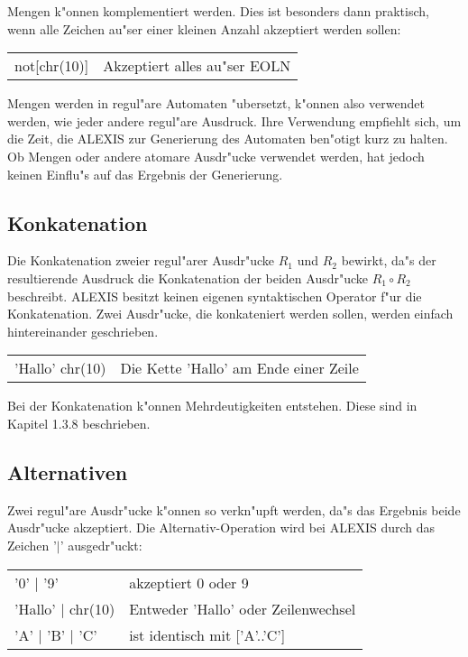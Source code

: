 \medskip

Mengen k"onnen komplementiert werden. Dies ist besonders dann praktisch, wenn alle
Zeichen au"ser einer kleinen Anzahl akzeptiert werden sollen:

\medskip

\begin{tabular}{ll}
not[chr(10)]&Akzeptiert alles au"ser EOLN\\
\end{tabular}

\medskip

Mengen werden in regul"are Automaten "ubersetzt, k"onnen also verwendet werden, wie 
jeder andere regul"are Ausdruck. Ihre Verwendung empfiehlt sich, um die Zeit, die
ALEXIS zur Generierung des Automaten ben"otigt kurz zu halten. Ob Mengen oder andere
atomare Ausdr"ucke verwendet werden, hat jedoch keinen Einflu"s auf das Ergebnis der
Generierung.
\subsection{Konkatenation}
Die Konkatenation zweier regul"arer Ausdr"ucke $R_1$ und $R_2$ bewirkt, da"s der 
resultierende Ausdruck die Konkatenation der beiden Ausdr"ucke $R_1 \circ R_2$
beschreibt. ALEXIS besitzt keinen eigenen syntaktischen Operator f"ur die
Konkatenation. Zwei Ausdr"ucke, die konkateniert werden sollen, werden einfach
hintereinander geschrieben.

\medskip

\begin{tabular}{ll}
'Hallo' chr(10)&Die Kette 'Hallo' am Ende einer Zeile\\
\end{tabular}

\medskip

Bei der Konkatenation k"onnen Mehrdeutigkeiten entstehen. Diese sind in Kapitel
1.3.8 beschrieben.
\subsection{Alternativen}
Zwei regul"are Ausdr"ucke k"onnen so verkn"upft werden, da"s das Ergebnis beide
Ausdr"ucke akzeptiert. Die Alternativ-Operation wird bei ALEXIS durch das
Zeichen '$\mid$' ausgedr"uckt:

\medskip

\begin{tabular}{ll}
'0' $\mid$ '9'&akzeptiert 0 oder 9\\
'Hallo' $\mid$ chr(10)&Entweder 'Hallo' oder Zeilenwechsel\\
'A' $\mid$ 'B' $\mid$ 'C'&ist identisch mit ['A'..'C']\\
\end{tabular}

